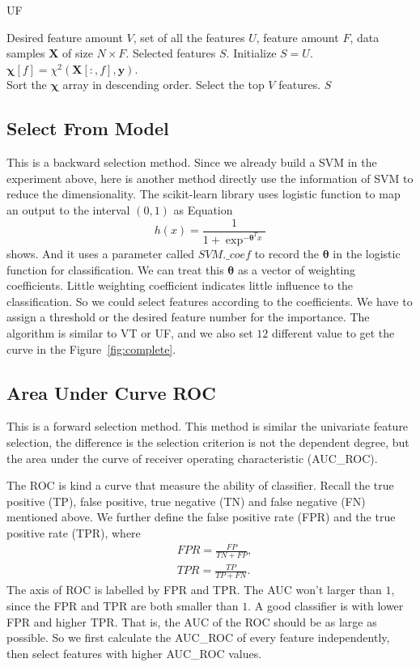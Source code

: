 \documentclass{article}
\newcommand{\Xmat}{{\boldsymbol X}}
\newcommand{\yv}{\boldsymbol{y}}
\newcommand{\thetav}{\boldsymbol{\theta}}
\newcommand{\chiv}[0]{{\boldsymbol{\chi}} }
\begin{document}
\begin{algorithm}
	\caption{UF}
	\label{alg:uf}
	\begin{algorithmic}[1]
		\REQUIRE Desired feature amount $V$, set of all the features $U$, feature amount $F$, data samples $\Xmat$ of size $N\times F$.
		\ENSURE Selected features $S$.
		\STATE Initialize $S=U$.
			\STATE $\chiv[f] = \chi^2(\Xmat[:,f],\yv)$.
		\ENDFOR\\
		\STATE Sort the $\chiv$ array in descending order.
		\STATE Select the top $V$ features.
		\RETURN $S$
	\end{algorithmic}
\end{algorithm}

\subsection{Select From Model}
This is a backward selection method. Since we already build a SVM in the experiment above, here is another method directly use the information of SVM to reduce the dimensionality. The scikit-learn library uses logistic function to map an output to the interval $(0,1)$ as Equation
\begin{equation}
	\label{eq:coef}
	h(x) = \frac{1}{1+\exp^{-\thetav^Tx}}
\end{equation}
shows. And it uses a parameter called $SVM.\_coef$ to record the $\thetav$ in the logistic function for classification. We can treat this $\thetav$ as a vector of weighting coefficients. Little weighting coefficient indicates little influence to the classification. So we could select features according to the coefficients. We have to assign a threshold or the desired feature number for the importance. The algorithm is similar to VT or UF, and we also set $12$ different value to get the curve in the Figure~\ref{fig:complete}.


\subsection{Area Under Curve ROC}
This is a forward selection method. This method is similar the univariate feature selection, the difference is the selection criterion is not the dependent degree, but the area under the curve of receiver operating characteristic (AUC\_ROC). 

The ROC is kind a curve that measure the ability of classifier. Recall the true positive (TP), false positive, true negative (TN) and false negative (FN) mentioned above. We further define the false positive rate (FPR) and the true positive rate (TPR), where
\begin{equation}
	\label{eq:roc}
	\begin{split}
		&FPR = \frac{FP}{TN+FP},\\
		&TPR = \frac{TP}{TP+FN}.
	\end{split}
\end{equation} 
The axis of ROC is labelled by FPR and TPR. The AUC won't larger than $1$, since the FPR and TPR are both smaller than $1$. A good classifier is with lower FPR and higher TPR. That is, the AUC of the ROC should be as large as possible. So we first calculate the AUC\_ROC of every feature independently, then select features with higher AUC\_ROC values. 
\end{document}
